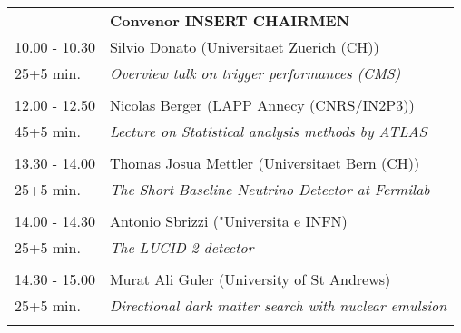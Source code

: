 \begin{longtable}{p{3cm}p{13cm}}
&\hfill {\bf Convenor INSERT CHAIRMEN }\\ 
10.00 - 10.30 & Silvio Donato (Universitaet Zuerich (CH))\\ 
25+5 min. & {\it Overview talk on trigger performances (CMS)}\\ 
 & \\ 
12.00 - 12.50 & Nicolas Berger (LAPP Annecy (CNRS/IN2P3))\\ 
45+5 min. & {\it Lecture on Statistical analysis methods by ATLAS}\\ 
 & \\ 
13.30 - 14.00 & Thomas Josua Mettler (Universitaet Bern (CH))\\ 
25+5 min. & {\it The Short Baseline Neutrino Detector at Fermilab}\\ 
 & \\ 
14.00 - 14.30 & Antonio Sbrizzi ("Universita e INFN)\\ 
25+5 min. & {\it The LUCID-2 detector}\\ 
 & \\ 
14.30 - 15.00 & Murat Ali Guler (University of St Andrews)\\ 
25+5 min. & {\it Directional dark matter search with nuclear emulsion}\\ 
 & \\ 
\end{longtable}


